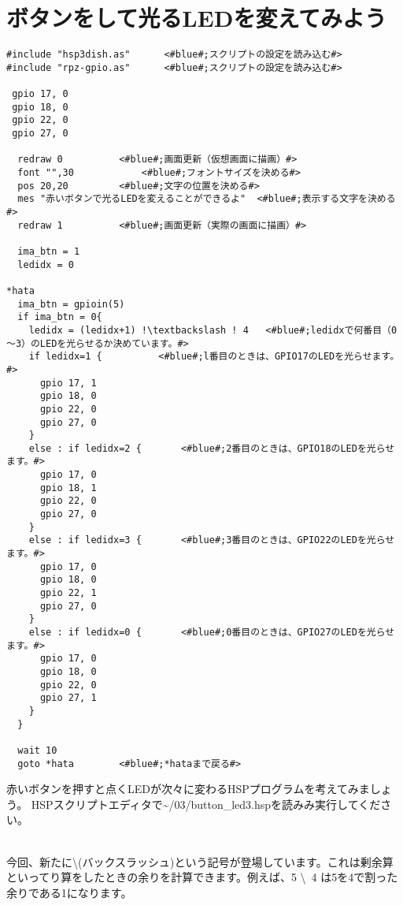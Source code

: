 \newpage
\section{ボタンをして光るLEDを変えてみよう}
\begin{lstlisting}[escapechar=!,caption=\textasciitilde/03/button\_led3.hsp,label=button_led3.hsp]
#include "hsp3dish.as"		<#blue#;スクリプトの設定を読み込む#>
#include "rpz-gpio.as"		<#blue#;スクリプトの設定を読み込む#>

 gpio 17, 0
 gpio 18, 0
 gpio 22, 0
 gpio 27, 0
	
  redraw 0			<#blue#;画面更新（仮想画面に描画）#>
  font "",30			<#blue#;フォントサイズを決める#>
  pos 20,20			<#blue#;文字の位置を決める#>
  mes "赤いボタンで光るLEDを変えることができるよ"	<#blue#;表示する文字を決める#>
  redraw 1			<#blue#;画面更新（実際の画面に描画）#>

  ima_btn = 1
  ledidx = 0

*hata
  ima_btn = gpioin(5)
  if ima_btn = 0{
    ledidx = (ledidx+1) !\textbackslash ! 4	  <#blue#;ledidxで何番目（0～3）のLEDを光らせるか決めています。#>
    if ledidx=1 {		   <#blue#;l番目のときは、GPIO17のLEDを光らせます。#>
      gpio 17, 1
      gpio 18, 0
      gpio 22, 0
      gpio 27, 0
    }
    else : if ledidx=2 {	   <#blue#;2番目のときは、GPIO18のLEDを光らせます。#>
      gpio 17, 0
      gpio 18, 1
      gpio 22, 0
      gpio 27, 0
    }
    else : if ledidx=3 {	   <#blue#;3番目のときは、GPIO22のLEDを光らせます。#>
      gpio 17, 0
      gpio 18, 0
      gpio 22, 1
      gpio 27, 0
    }
    else : if ledidx=0 {	   <#blue#;0番目のときは、GPIO27のLEDを光らせます。#>
      gpio 17, 0
      gpio 18, 0
      gpio 22, 0
      gpio 27, 1
    }
  }

  wait 10
  goto *hata		<#blue#;*hataまで戻る#>
\end{lstlisting}

赤いボタンを押すと点くLEDが次々に変わるHSPプログラムを考えてみましょう。
HSPスクリプトエディタで\textasciitilde/03/button\_led3.hspを読みみ実行してください。

\noindent \textbf{}\\
今回、新たに\textbackslash (バックスラッシュ)という記号が登場しています。これは剰余算といってり算をしたときの余りを計算できます。例えば、5 \textbackslash \ 4 は5を4で割った余りである1になります。

